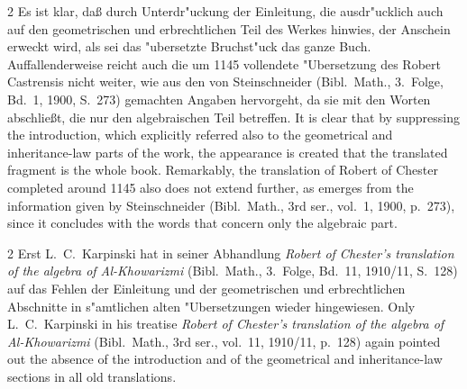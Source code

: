 \documentclass[10pt,a4paper]{article}
\renewcommand{\switchcolumn}{\syncronize\nointerlineskip\columnbreak}
\begin{document}
\begin{paracol}{2}
Es ist klar, da\ss{} durch Unterdr"uckung der Einleitung, die ausdr"ucklich auch auf den geometrischen und erbrechtlichen Teil des Werkes hinwies, der Anschein erweckt wird, als sei das "ubersetzte Bruchst"uck das ganze Buch. Auffallenderweise reicht auch die um 1145 vollendete "Ubersetzung des Robert Castrensis nicht weiter, wie aus den von Steinschneider (Bibl.\ Math., 3.\ Folge, Bd.\ 1, 1900, S.\ 273) gemachten Angaben hervorgeht, da sie mit den Worten abschlie\ss{}t, die nur den algebraischen Teil betreffen.
\switchcolumn
It is clear that by suppressing the introduction, which explicitly referred also to the geometrical and inheritance-law parts of the work, the appearance is created that the translated fragment is the whole book. Remarkably, the translation of Robert of Chester completed around 1145 also does not extend further, as emerges from the information given by Steinschneider (Bibl.\ Math., 3rd ser., vol.\ 1, 1900, p.\ 273), since it concludes with the words that concern only the algebraic part.
\end{paracol}

\begin{paracol}{2}
Erst L.\ C.\ Karpinski hat in seiner Abhandlung \textit{Robert of Chester's translation of the algebra of Al-Khowarizmi} (Bibl.\ Math., 3.\ Folge, Bd.\ 11, 1910/11, S.\ 128) auf das Fehlen der Einleitung und der geometrischen und erbrechtlichen Abschnitte in s"amtlichen alten "Ubersetzungen wieder hingewiesen.
\switchcolumn
Only L.\ C.\ Karpinski in his treatise \textit{Robert of Chester's translation of the algebra of Al-Khowarizmi} (Bibl.\ Math., 3rd ser., vol.\ 11, 1910/11, p.\ 128) again pointed out the absence of the introduction and of the geometrical and inheritance-law sections in all old translations.
\end{paracol}
\end{document}
